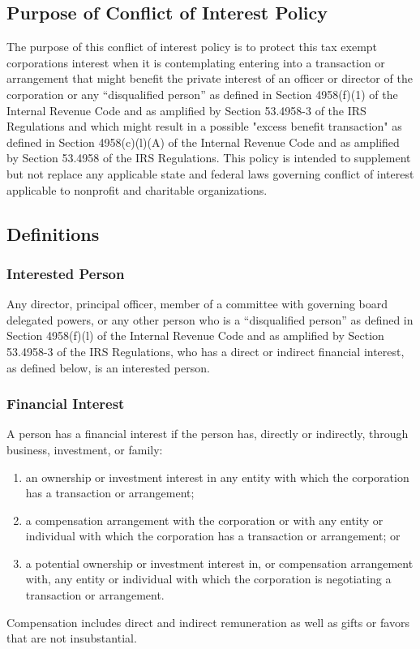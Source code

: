 \documentclass{article}
\begin{document}
	\subsection{Purpose of Conflict of Interest Policy}
	The purpose of this conflict of interest policy is to protect this tax ­exempt corporation\textquotesingle s interest when it is contemplating entering into a transaction or arrangement that might benefit the private interest of an officer or director of the corporation or any “disqualified person” as defined in Section 4958(f)(1) of the Internal Revenue Code and as amplified by Section 53.4958-3 of the IRS Regulations and which might result in a possible "excess benefit transaction" as defined in Section 4958(c)(l)(A) of the Internal Revenue Code and as amplified by Section 53.4958 of the IRS Regulations. This policy is intended to supplement but not replace any applicable state and federal laws governing conflict of interest applicable to nonprofit and charitable organizations.
	\subsection{Definitions}
		\subsubsection{Interested Person}
		Any director, principal officer, member of a committee with governing board delegated powers, or any other person who is a ``disqualified person'' as defined in Section 4958(f)(l) of the Internal Revenue Code and as amplified by Section 53.4958-3 of the IRS Regulations, who has a direct or indirect financial interest, as defined below, is an interested person.
		\subsubsection{Financial Interest}
		A person has a financial interest if the person has, directly or indirectly, through business, investment, or family:
		\begin{enumerate}[\indent (a)] 
			\item an ownership or investment interest in any entity with which the corporation has a transaction or arrangement;
			\item a compensation arrangement with the corporation or with any entity or individual with which the corporation has a transaction or arrangement; or
			\item a potential ownership or investment interest in, or compensation arrangement with, any entity or individual with which the corporation is negotiating a transaction or arrangement.
		\end{enumerate}
		Compensation includes direct and indirect remuneration as well as gifts or favors that are not insubstantial.
		
\end{document}
